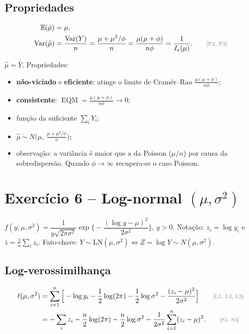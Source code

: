 \documentclass[11pt,a4paper]{article}
\newcommand{\E}{\mathbb{E}}
\newcommand{\Var}{\operatorname{Var}}
\newcommand{\EQM}{\operatorname{EQM}}
\newcommand{\bY}{\bar{Y}}
\newcommand{\just}[1]{\tag*{\footnotesize\textcolor{gray}{[#1]}}}
\theoremstyle{definition}
\theoremstyle{plain}
\begin{document}
\subsection*{Propriedades}
\begin{align*}
\E(\hat\mu)&=\mu,\\
\Var(\hat\mu)&=\frac{\Var(Y)}{n}=\frac{\mu+\mu^2/\phi}{n}=\frac{\mu(\mu+\phi)}{n\phi}=\frac{1}{I_e(\mu)}. \just{P2, P3}
\end{align*}
\begin{resposta}
$\hat\mu=\bY$. Propriedades:
\begin{itemize}[leftmargin=1.2em]
\item \textbf{não-viciado} e \textbf{eficiente}: atinge o limite de Cramér--Rao $\frac{\mu(\mu+\phi)}{n\phi}$;
\item \textbf{consistente}: $\EQM=\frac{\mu(\mu+\phi)}{n\phi}\to0$;
\item função da suficiente $\sum_iY_i$;
\item $\hat\mu\ \dot\sim\ N\big(\mu,\ \frac{\mu+\mu^2/\phi}{n}\big)$;
\item observação: a variância é maior que a da Poisson ($\mu/n$) por causa da sobredispersão. Quando $\phi\to\infty$ recupera-se o caso Poisson.
\end{itemize}
\end{resposta}

\section{Exercício 6 -- Log-normal $(\mu,\sigma^2)$}

$f(y;\mu,\sigma^2)=\dfrac{1}{y\sqrt{2\pi\sigma^2}}\exp\Big\{-\dfrac{(\log y-\mu)^2}{2\sigma^2}\Big\}$, $y>0$. Notação: $z_i=\log y_i$ e $\bar z=\frac1n\sum_iz_i$. Fato-chave: $Y\sim\text{LN}(\mu,\sigma^2)\iff Z=\log Y\sim N(\mu,\sigma^2)$.

\subsection*{Log-verossimilhança}
\begin{align*}
\ell(\mu,\sigma^2)&=\sum_{i=1}^n\Big[-\log y_i-\frac12\log(2\pi)-\frac12\log\sigma^2-\frac{(z_i-\mu)^2}{2\sigma^2}\Big] \just{L1, L2, L3}\\
&=-\sum_iz_i-\frac n2\log(2\pi)-\frac n2\log\sigma^2-\frac{1}{2\sigma^2}\sum_{i=1}^n(z_i-\mu)^2 . \just{S1, S3}
\end{align*}
\end{document}
